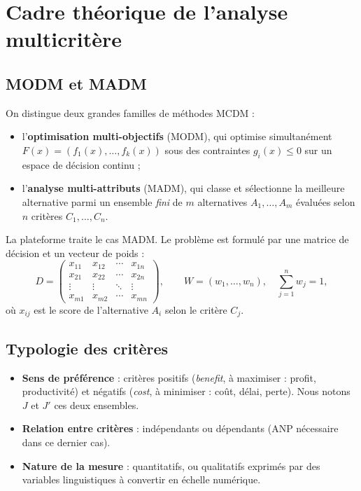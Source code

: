 \documentclass[11pt,a4paper]{report}
\theoremstyle{definition}
\theoremstyle{remark}
\begin{document}
\chapter{Cadre théorique de l'analyse multicritère}\label{ch:theorie}

\section{MODM et MADM}

On distingue deux grandes familles de méthodes MCDM :
\begin{itemize}
  \item l'\textbf{optimisation multi-objectifs} (MODM), qui optimise simultanément
        $F(x)=(f_1(x),\dots,f_k(x))$ sous des contraintes $g_i(x)\le 0$ sur un espace de décision continu ;
  \item l'\textbf{analyse multi-attributs} (MADM), qui classe et sélectionne la meilleure alternative parmi
        un ensemble \emph{fini} de $m$ alternatives $A_1,\dots,A_m$ évaluées selon $n$ critères
        $C_1,\dots,C_n$.
\end{itemize}
La plateforme traite le cas MADM. Le problème est formulé par une matrice de décision et un vecteur de
poids :
\begin{equation}
  D=\begin{pmatrix}
    x_{11} & x_{12} & \cdots & x_{1n}\\
    x_{21} & x_{22} & \cdots & x_{2n}\\
    \vdots & \vdots & \ddots & \vdots\\
    x_{m1} & x_{m2} & \cdots & x_{mn}
  \end{pmatrix},\qquad W=(w_1,\dots,w_n),\quad \sum_{j=1}^n w_j=1,
\end{equation}
où $x_{ij}$ est le score de l'alternative $A_i$ selon le critère $C_j$.

\section{Typologie des critères}

\begin{itemize}
  \item \textbf{Sens de préférence} : critères positifs (\emph{benefit}, à maximiser : profit,
        productivité) et négatifs (\emph{cost}, à minimiser : coût, délai, perte). Nous notons $J$ et $J'$
        ces deux ensembles.
  \item \textbf{Relation entre critères} : indépendants ou dépendants (ANP nécessaire dans ce dernier cas).
  \item \textbf{Nature de la mesure} : quantitatifs, ou qualitatifs exprimés par des variables
        linguistiques à convertir en échelle numérique.
\end{itemize}
\end{document}
